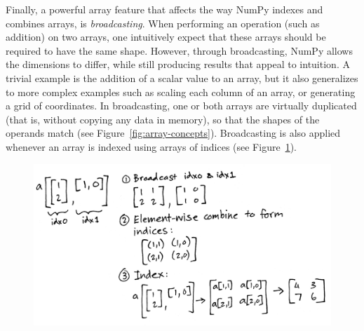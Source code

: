 
Finally, a powerful array feature that affects the way NumPy indexes and combines arrays, is {\em broadcasting}. When performing an operation (such as addition) on two arrays, one intuitively expect that these arrays should be required to have the same shape.  However, through broadcasting, NumPy allows the dimensions to differ, while still producing results that appeal to intuition.  A trivial example is the addition of a scalar value to an array, but it also generalizes to more complex examples such as scaling each column of an array, or generating a grid of coordinates.  In broadcasting, one or both arrays are virtually duplicated (that is, without copying any data in memory), so that the shapes of the operands match (see Figure~\ref{fig:array-concepts}).  Broadcasting is also applied whenever an array is indexed using arrays of indices (see Figure~\ref{fig:broadcasting}).

\begin{figure}
  \centering
  \includegraphics[width=\linewidth]{static/sketches/fancy-indexing}
  \caption{
   }
  \label{fig:broadcasting}
\end{figure}

